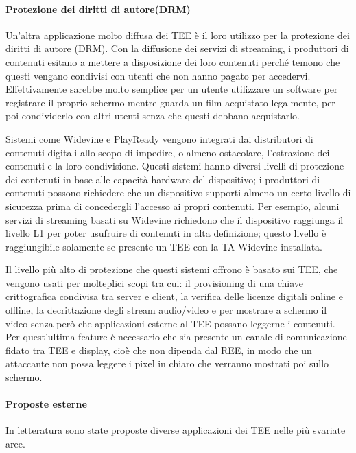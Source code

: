 \documentclass[12pt,italian]{report}
\begin{document}
\paragraph{Protezione dei diritti di autore(DRM)}

Un'altra applicazione molto diffusa dei TEE è il loro utilizzo per la protezione
dei diritti di autore (DRM). Con la diffusione dei servizi di streaming, i
produttori di contenuti esitano a mettere a disposizione dei loro contenuti
perché temono che questi vengano condivisi con utenti che non hanno pagato
per accedervi.
Effettivamente sarebbe molto semplice per un utente utilizzare un software per
registrare il proprio schermo mentre guarda un film acquistato legalmente, per
poi condividerlo con altri utenti senza che questi debbano acquistarlo.

Sistemi come Widevine\cite{widevine} e PlayReady\cite{playready} vengono
integrati dai distributori di contenuti digitali allo scopo di impedire, o
almeno ostacolare, l'estrazione dei contenuti e la loro condivisione.
Questi sistemi hanno diversi livelli di protezione dei contenuti in base alle
capacità hardware del dispositivo; i produttori di contenuti possono richiedere
che un dispositivo supporti almeno un certo livello di sicurezza prima di
concedergli l'accesso ai propri contenuti.
Per esempio, alcuni servizi di streaming basati su Widevine richiedono che il
dispositivo raggiunga il livello L1 per poter usufruire di contenuti in alta
definizione; questo livello è raggiungibile solamente se presente un TEE con
la TA Widevine installata.

Il livello più alto di protezione che questi sistemi offrono è basato sui TEE,
che vengono usati per molteplici scopi tra cui: il provisioning di una chiave
crittografica condivisa tra server e client, la verifica delle licenze digitali
online e offline, la decrittazione degli stream audio/video e per mostrare
a schermo il video senza però che applicazioni esterne al TEE possano leggerne
i contenuti.
Per quest'ultima feature è necessario che sia presente un canale di
comunicazione fidato tra TEE e display, cioè che non dipenda dal REE, in modo
che un attaccante non possa leggere i pixel in chiaro che verranno mostrati poi
sullo schermo. 

\paragraph{Proposte esterne}

In letteratura sono state proposte diverse applicazioni dei TEE nelle più svariate aree.
\end{document}

